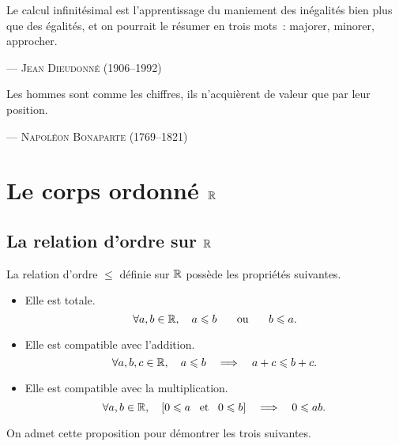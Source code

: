 \documentclass{magnoliaold}
\begin{document}
\setlength{}
\epigraph{\og Le calcul infinitésimal est l'apprentissage du maniement des inégalités bien plus que des égalités, et on pourrait le résumer en trois mots~: majorer, minorer, approcher.\fg}{--- \textsc{Jean Dieudonné (1906--1992)}}
\setlength{}
\epigraph{\og Les hommes sont comme les chiffres, ils n'acquièrent de valeur que par leur position.\fg}{--- \textsc{Napoléon Bonaparte (1769--1821)}}
\magtoc

\section{Le corps ordonné $\mathbb{R}$}

\subsection{La relation d'ordre sur $\mathbb{R}$}


\begin{proposition}[utile=-3]
La relation d'ordre $\leq$ définie sur $\mathbb{R}$ possède les propriétés suivantes.
\begin{itemize}
\item Elle est totale.
  \[\forall a,b\in\mathbb{R} ,\quad a\leqslant b \quad\quad\!\text{ou}\quad\!\quad b\leqslant a.\]
\item Elle est compatible avec l'addition.
  \[\forall a,b,c\in\mathbb{R} ,\quad a\leqslant b \quad\Longrightarrow\quad a+c\leqslant b+c.\]
\item Elle est compatible avec la multiplication.
  \[\forall a,b\in\mathbb{R} ,\quad \left[0\leqslant a \quad\!\text{et}\quad\! 0\leqslant b\right] \quad\Longrightarrow\quad 0\leqslant ab.\]
\end{itemize}
\end{proposition}

\begin{preuve}
On admet cette proposition pour démontrer les trois suivantes.
\end{preuve}
\end{document}
